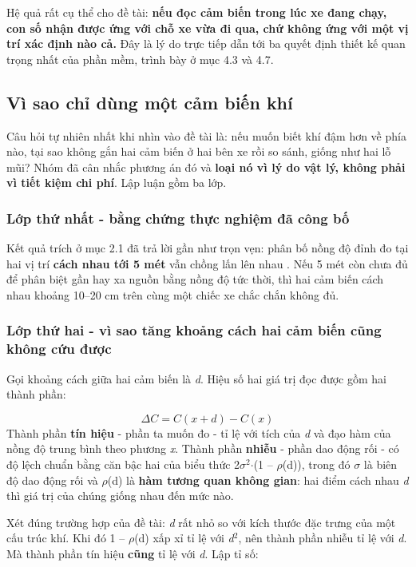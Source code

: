 Hệ quả rất cụ thể cho đề tài: \textbf{nếu đọc cảm biến trong lúc xe đang chạy, con số nhận được ứng với chỗ xe vừa đi qua, chứ không ứng với một vị trí xác định nào cả.} Đây là lý do trực tiếp dẫn tới ba quyết định thiết kế quan trọng nhất của phần mềm, trình bày ở mục 4.3 và 4.7.


\subsection{Vì sao chỉ dùng một cảm biến khí}
Câu hỏi tự nhiên nhất khi nhìn vào đề tài là: nếu muốn biết khí đậm hơn về phía nào, tại sao không gắn hai cảm biến ở hai bên xe rồi so sánh, giống như hai lỗ mũi? Nhóm đã cân nhắc phương án đó và \textbf{loại nó vì lý do vật lý, không phải vì tiết kiệm chi phí}. Lập luận gồm ba lớp.


\subsubsection{Lớp thứ nhất - bằng chứng thực nghiệm đã công bố}
Kết quả trích ở mục 2.1 đã trả lời gần như trọn vẹn: phân bố nồng độ đỉnh đo tại hai vị trí \textbf{cách nhau tới 5 mét} vẫn chồng lấn lên nhau \cite[tr.~517]{r1}. Nếu 5 mét còn chưa đủ để phân biệt gần hay xa nguồn bằng nồng độ tức thời, thì hai cảm biến cách nhau khoảng 10--20 cm trên cùng một chiếc xe chắc chắn không đủ.


\subsubsection{Lớp thứ hai - vì sao tăng khoảng cách hai cảm biến cũng không cứu được}
Gọi khoảng cách giữa hai cảm biến là \textit{d}. Hiệu số hai giá trị đọc được gồm hai thành phần:

\[ \Delta C = C(x+d) - C(x) \]
Thành phần \textbf{tín hiệu} - phần ta muốn đo - tỉ lệ với tích của \textit{d} và đạo hàm của nồng độ trung bình theo phương \textit{x}. Thành phần \textbf{nhiễu} - phần dao động rối - có độ lệch chuẩn bằng căn bậc hai của biểu thức 2$\sigma$$^{2}$$\cdot$(1 -- $\rho$(d)), trong đó $\sigma$ là biên độ dao động rối và $\rho$(d) là \textbf{hàm tương quan không gian}: hai điểm cách nhau \textit{d} thì giá trị của chúng giống nhau đến mức nào.

Xét đúng trường hợp của đề tài: \textit{d} rất nhỏ so với kích thước đặc trưng của một cấu trúc khí. Khi đó 1 -- $\rho$(d) xấp xỉ tỉ lệ với \textit{d}$^{2}$, nên thành phần nhiễu tỉ lệ với \textit{d}. Mà thành phần tín hiệu \textbf{cũng} tỉ lệ với \textit{d}. Lập tỉ số:

